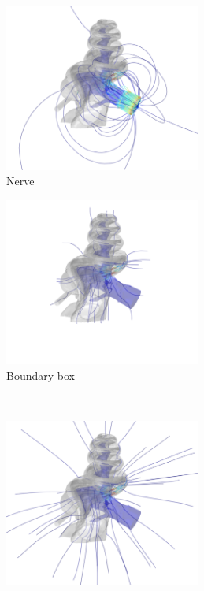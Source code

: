 \begin{figure}
    \centering
    
    \begin{subfigure}[t]{0.43\textwidth}
        \centering
        \includegraphics[height=5.5cm]{Simulations/BCs/streamlines-term4-nrv_gnd}
        \caption{Nerve}
        \label{fig:location_effect_streams_nerve}
    \end{subfigure}%
    \begin{subfigure}[t]{0.43\textwidth}
        \centering
        \includegraphics[height=5.5cm]{Simulations/BCs/streamlines-term4-b_box}
        \caption{Boundary box}
        \label{fig:location_effect_streams_box}
    \end{subfigure}%
    \begin{subfigure}[t]{0.09\textwidth}
        \phantom{\hspace{6.4mm}}
    \end{subfigure}\\%
    \vspace{1em}%
    \begin{subfigure}[t]{0.05\textwidth}
        \phantom{\hspace{6.5mm}}
    \end{subfigure}
    \begin{subfigure}[t]{0.43\textwidth}
        \centering
        \includegraphics[height=5.5cm]{Simulations/BCs/streamlines-term4-sph_r5}

\end{subfigure}
\end{figure}
